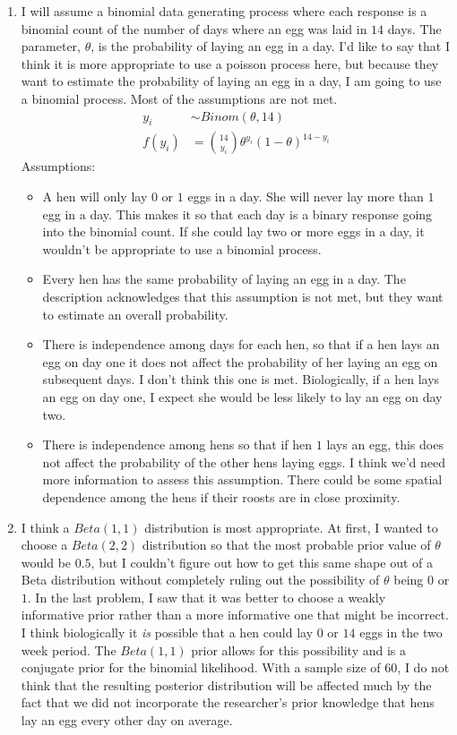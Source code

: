 \documentclass[11pt]{article}\usepackage[]{graphicx}\usepackage[]{color}
\begin{document}
\begin{doublespacing}
\begin{enumerate}
\begin{enumerate}
\item I will assume a binomial data generating process where each response is a binomial count of the number of days where an egg was laid in $14$ days. The parameter, $\theta$, is the probability of laying an egg in a day. I'd like to say that I think it is more appropriate to use a poisson process here, but because they want to estimate the probability of laying an egg in a day, I am going to use a binomial process. Most of the assumptions are not met.
\begin{align*}
y_i &\sim Binom(\theta, 14) \\
f(y_i) &= {14 \choose y_i}\theta^{y_i}(1-\theta)^{14-y_i}
\end{align*}
Assumptions:
\begin{itemize}
\item A hen will only lay $0$ or $1$ eggs in a day. She will never lay more than $1$ egg in a day. This makes it so that each day is a binary response going into the binomial count. If she could lay two or more eggs in a day, it wouldn't be appropriate to use a binomial process.
\item Every hen has the same probability of laying an egg in a day. The description acknowledges that this assumption is not met, but they want to estimate an overall probability.
\item There is independence among days for each hen, so that if a hen lays an egg on day one it does not affect the probability of her laying an egg on subsequent days. I don't think this one is met. Biologically, if a hen lays an egg on day one, I expect she would be less likely to lay an egg on day two.
\item There is independence among hens so that if hen $1$ lays an egg, this does not affect the probability of the other hens laying eggs. I think we'd need more information to assess this assumption. There could be some spatial dependence among the hens if their roosts are in close proximity.
\end{itemize}

\item I think a $Beta(1, 1)$ distribution is most appropriate. At first, I wanted to choose a $Beta(2, 2)$ distribution so that the most probable prior value of $\theta$ would be $0.5$, but I couldn't figure out how to get this same shape out of a Beta distribution without completely ruling out the possibility of $\theta$ being $0$ or $1$. In the last problem, I saw that it was better to choose a weakly informative prior rather than a more informative one that might be incorrect. I think biologically it {\it is} possible that a hen could lay $0$ or $14$ eggs in the two week period. The $Beta(1, 1)$ prior allows for this possibility and is a conjugate prior for the binomial likelihood. With a sample size of $60$, I do not think that the resulting posterior distribution will be affected much by the fact that we did not incorporate the researcher's prior knowledge that hens lay an egg every other day on average.


\end{enumerate}
\end{enumerate}
\end{doublespacing}
\end{document}

